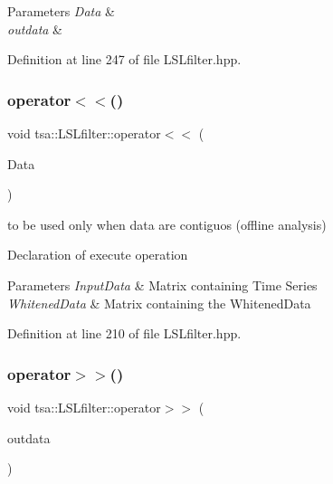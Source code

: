 \begin{DoxyParams}{Parameters}
{\em Data} & \\
\hline
{\em outdata} & \\
\hline
\end{DoxyParams}


Definition at line 247 of file L\+S\+Lfilter.\+hpp.

\mbox{\label{classtsa_1_1_l_s_lfilter_a4308a18bd0ecc82242c4df0529c1f573}} 
\subsubsection{\texorpdfstring{operator$<$$<$()}{operator<<()}}
{\footnotesize\ttfamily void tsa\+::\+L\+S\+Lfilter\+::operator$<$$<$ (\begin{DoxyParamCaption}\item[{\hyperlink{namespacetsa_ac599574bcc094eda25613724b8f3ca9e}{Seq\+View\+Double} \&}]{Data }\end{DoxyParamCaption})\hspace{0.3cm}{\ttfamily [inline]}}



to be used only when data are contiguos (offline analysis) 

Declaration of execute operation


\begin{DoxyParams}{Parameters}
{\em Input\+Data} & Matrix containing Time Series \\
\hline
{\em Whitened\+Data} & Matrix containing the Whitened\+Data \\
\hline
\end{DoxyParams}


Definition at line 210 of file L\+S\+Lfilter.\+hpp.

\mbox{\label{classtsa_1_1_l_s_lfilter_a8b0ecd9fa51d407daf718ac91776ebed}} 
\subsubsection{\texorpdfstring{operator$>$$>$()}{operator>>()}}
{\footnotesize\ttfamily void tsa\+::\+L\+S\+Lfilter\+::operator$>$$>$ (\begin{DoxyParamCaption}\item[{\hyperlink{namespacetsa_ac599574bcc094eda25613724b8f3ca9e}{Seq\+View\+Double} \&}]{outdata }\end{DoxyParamCaption})\hspace{0.3cm}{\ttfamily [inline]}}



